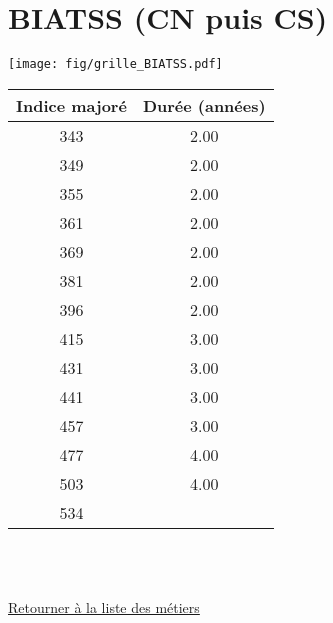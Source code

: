\chapter{BIATSS (CN puis CS)} 

\begin{minipage}{0.55\linewidth}\texttt{[image: fig/grille\_BIATSS.pdf]}\end{minipage} 
\begin{minipage}{0.3\linewidth} 
 \begin{center} 

\begin{tabular}[htb]{|c|c|} 
\hline 
 Indice majoré &  Durée (années) \\ 
\hline \hline 
 343 &  2.00 \\ 
\hline 
 349 &  2.00 \\ 
\hline 
 355 &  2.00 \\ 
\hline 
 361 &  2.00 \\ 
\hline 
 369 &  2.00 \\ 
\hline 
 381 &  2.00 \\ 
\hline 
 396 &  2.00 \\ 
\hline 
 415 &  3.00 \\ 
\hline 
 431 &  3.00 \\ 
\hline 
 441 &  3.00 \\ 
\hline 
 457 &  3.00 \\ 
\hline 
 477 &  4.00 \\ 
\hline 
 503 &  4.00 \\ 
\hline 
 534 &   \\ 
\hline 
\hline 
\end{tabular} 
\end{center} 
 \end{minipage} 

~\\ 
 


   
 \localtableofcontents 

~\\ 
 
 \hyperlink{page.2}{\noindent Retourner à la liste des métiers}

